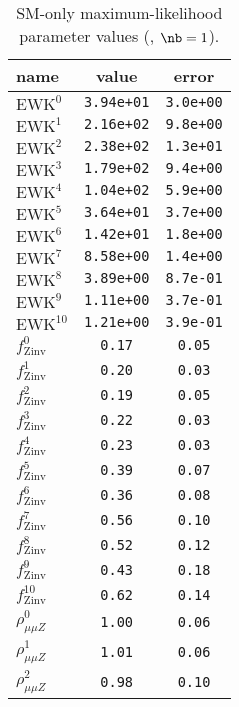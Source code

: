 \begin{table}\centering
\caption{SM-only maximum-likelihood parameter values (\njethigh, $\nb = 1$).}
\label{tab:mlParameterValues1b_ge4j}
\begin{tabular}{lcc}name & value & error \\ \hline
$\mathrm{EWK}^{0}$ & {\tt  3.94e+01} & {\tt  3.0e+00}\\
$\mathrm{EWK}^{1}$ & {\tt  2.16e+02} & {\tt  9.8e+00}\\
$\mathrm{EWK}^{2}$ & {\tt  2.38e+02} & {\tt  1.3e+01}\\
$\mathrm{EWK}^{3}$ & {\tt  1.79e+02} & {\tt  9.4e+00}\\
$\mathrm{EWK}^{4}$ & {\tt  1.04e+02} & {\tt  5.9e+00}\\
$\mathrm{EWK}^{5}$ & {\tt  3.64e+01} & {\tt  3.7e+00}\\
$\mathrm{EWK}^{6}$ & {\tt  1.42e+01} & {\tt  1.8e+00}\\
$\mathrm{EWK}^{7}$ & {\tt  8.58e+00} & {\tt  1.4e+00}\\
$\mathrm{EWK}^{8}$ & {\tt  3.89e+00} & {\tt  8.7e-01}\\
$\mathrm{EWK}^{9}$ & {\tt  1.11e+00} & {\tt  3.7e-01}\\
$\mathrm{EWK}^{10}$ & {\tt  1.21e+00} & {\tt  3.9e-01}\\
$f_\mathrm{Zinv}^{0}$ & {\tt 0.17} & {\tt 0.05}\\
$f_\mathrm{Zinv}^{1}$ & {\tt 0.20} & {\tt 0.03}\\
$f_\mathrm{Zinv}^{2}$ & {\tt 0.19} & {\tt 0.05}\\
$f_\mathrm{Zinv}^{3}$ & {\tt 0.22} & {\tt 0.03}\\
$f_\mathrm{Zinv}^{4}$ & {\tt 0.23} & {\tt 0.03}\\
$f_\mathrm{Zinv}^{5}$ & {\tt 0.39} & {\tt 0.07}\\
$f_\mathrm{Zinv}^{6}$ & {\tt 0.36} & {\tt 0.08}\\
$f_\mathrm{Zinv}^{7}$ & {\tt 0.56} & {\tt 0.10}\\
$f_\mathrm{Zinv}^{8}$ & {\tt 0.52} & {\tt 0.12}\\
$f_\mathrm{Zinv}^{9}$ & {\tt 0.43} & {\tt 0.18}\\
$f_\mathrm{Zinv}^{10}$ & {\tt 0.62} & {\tt 0.14}\\
$\rho_{\mu\mu Z}^{0}$ & {\tt 1.00} & {\tt 0.06}\\
$\rho_{\mu\mu Z}^{1}$ & {\tt 1.01} & {\tt 0.06}\\
$\rho_{\mu\mu Z}^{2}$ & {\tt 0.98} & {\tt 0.10}\\

\end{tabular}
\end{table}
